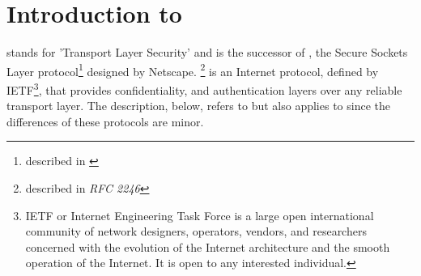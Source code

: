 \chapter{Introduction to \tls{}}

\label{sec:tlsintro}
\tls{} stands for 'Transport Layer Security' and is the successor of \ssl{},
the Secure Sockets Layer protocol\footnote{described in \cite{SSL3}} designed by Netscape. 
\tlsI{}\footnote{described in {\it RFC 2246}\cite{RFC2246}} is an Internet protocol,
defined by {IETF}\footnote{IETF or Internet Engineering Task Force 
is a large open international community of network
designers, operators, vendors, and researchers concerned with the evolution of 
the Internet architecture and the smooth operation of the Internet. It is open 
to any interested individual.}, 
that provides confidentiality, and authentication layers over any reliable
transport layer. The description, below, refers to \tlsI{} but also
applies to \sslIII{} since the differences of these protocols are minor.












